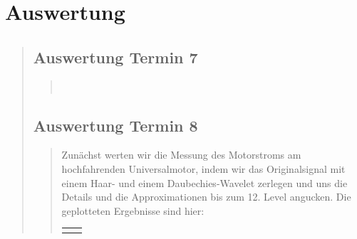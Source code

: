 \section{Auswertung}
\begin{quote}
    \subsection{Auswertung Termin 7}
    \begin{quote}
         \\
    \end{quote}  %

    \subsection{Auswertung Termin 8}
    \begin{quote}
        
        Zunächst werten wir die Messung des Motorstroms am hochfahrenden
        Universalmotor, indem wir das Originalsignal mit einem Haar- und einem
        Daubechies-Wavelet zerlegen und uns die Details und die Approximationen
        bis zum 12. Level angucken. Die geplotteten Ergebnisse sind hier:
        
         \begin{center}
                \begin{tabular}{ll}
    
                \hspace{-8em}
                    \begin{minipage}{0.6\textwidth}
    

\end{minipage}
\end{tabular}
\end{center}
\end{quote}
\end{quote}
